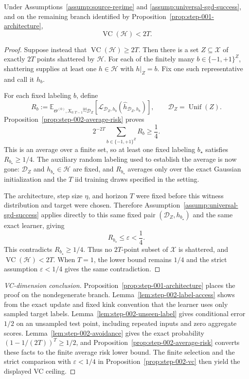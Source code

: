 \begin{proposition}
\label{prop:step-002-vc}
Under Assumptions~\ref{assump:source-regime} and
\ref{assump:universal-sgd-success}, and on the remaining branch identified by
Proposition~\ref{prop:step-001-architecture},
\[
\operatorname{VC}(\mathcal H)<2T.
\]
\end{proposition}

\begin{proof}
Suppose instead that $\operatorname{VC}(\mathcal H)\geq 2T$.  Then there is
a set $Z\subseteq\mathcal X$ of exactly $2T$ points shattered by $\mathcal H$.
For each of the finitely many $b\in\{-1,+1\}^{Z}$, shattering supplies at
least one $h\in\mathcal H$ with $h|_Z=b$.  Fix one such representative and
call it $h_b$.

For each fixed labeling $b$, define
\[
R_b:=\mathbb E_{\Theta^{(0)},X_{0:T-1}\stackrel{\mathrm{iid}}{\sim}\mathcal D_Z}
\!\left[\mathcal L_{\mathcal D_Z,h_b}
(\widehat h_{\mathcal D_Z,h_b})\right],
\qquad \mathcal D_Z=\operatorname{Unif}(Z).
\]
Proposition~\ref{prop:step-002-average-risk} proves
\[
2^{-2T}\sum_{b\in\{-1,+1\}^{Z}}R_b\geq\frac14.
\]
This is an average over a finite set, so at least one fixed labeling $b_\star$
satisfies $R_{b_\star}\geq1/4$.  The auxiliary random labeling used to
establish the average is now gone: $\mathcal D_Z$ and
$h_{b_\star}\in\mathcal H$ are fixed, and $R_{b_\star}$ averages only over
the exact Gaussian initialization and the $T$ iid training draws specified
in the setting.

The architecture, step size $\eta$, and horizon $T$ were fixed before this
witness distribution and target were chosen.  Therefore
Assumption~\ref{assump:universal-sgd-success} applies directly to this same
fixed pair $(\mathcal D_Z,h_{b_\star})$ and the same exact learner, giving
\[
R_{b_\star}\leq\varepsilon<\frac14.
\]
This contradicts $R_{b_\star}\geq 1/4$.  Thus no $2T$-point subset of
$\mathcal X$ is shattered, and $\operatorname{VC}(\mathcal H)<2T$.
When $T=1$, the lower bound remains $1/4$ and the strict assumption
$\varepsilon<1/4$ gives the same contradiction.
\end{proof}

\begin{proof}[VC-dimension conclusion]
Proposition~\ref{prop:step-001-architecture} places the proof on the
nondegenerate branch.  Lemma~\ref{lem:step-002-label-access} shows from the
exact update and fixed kink convention that the learner uses only sampled
target labels.  Lemma~\ref{lem:step-002-unseen-label} gives conditional error
$1/2$ on an unsampled test point, including repeated inputs and zero aggregate
scores.  Lemma~\ref{lem:step-002-avoidance} gives the exact probability
$(1-1/(2T))^T\geq 1/2$, and Proposition~\ref{prop:step-002-average-risk}
converts these facts to the finite average risk lower bound.  The finite
selection and the strict comparison with $\varepsilon<1/4$ in
Proposition~\ref{prop:step-002-vc} then yield the displayed VC ceiling.
\end{proof}


